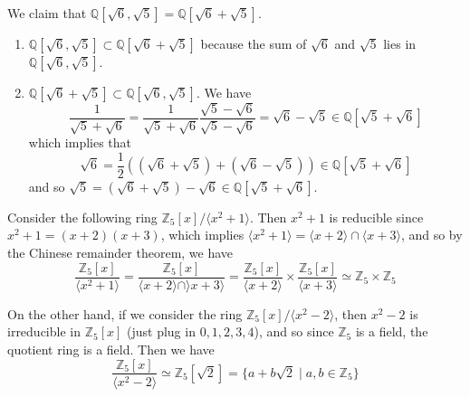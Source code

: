   \begin{example}
    We claim that $\mathbb{Q}[\sqrt{6}, \sqrt{5}] = \mathbb{Q}[\sqrt{6} + \sqrt{5}]$. 
    \begin{enumerate}
      \item $\mathbb{Q}[\sqrt{6}, \sqrt{5}] \subset \mathbb{Q}[\sqrt{6} + \sqrt{5}]$ because the sum of $\sqrt{6}$ and $\sqrt{5}$ lies in $\mathbb{Q}[\sqrt{6}, \sqrt{5}]$. 
      \item $\mathbb{Q}[\sqrt{6} + \sqrt{5}] \subset \mathbb{Q}[\sqrt{6}, \sqrt{5}]$. We have 
        \begin{equation}
          \frac{1}{\sqrt{5} + \sqrt{6}} = \frac{1}{\sqrt{5} + \sqrt{6}} \frac{\sqrt{5} - \sqrt{6}}{\sqrt{5} - \sqrt{6}} = \sqrt{6} - \sqrt{5} \in \mathbb{Q}[\sqrt{5} + \sqrt{6}] 
        \end{equation}
        which implies that 
        \begin{equation}
          \sqrt{6} = \frac{1}{2} ((\sqrt{6} + \sqrt{5}) + (\sqrt{6} - \sqrt{5})) \in \mathbb{Q}[\sqrt{5} + \sqrt{6}] 
        \end{equation}
        and so $\sqrt{5} = (\sqrt{6} + \sqrt{5}) - \sqrt{6} \in \mathbb{Q}[\sqrt{5} + \sqrt{6}]$. 
    \end{enumerate}
  \end{example}

  \begin{example}
    Consider the following ring $\mathbb{Z}_5 [x] / \langle x^2 + 1 \rangle$. Then $x^2 + 1$ is reducible since $x^2 + 1 = (x + 2) (x + 3)$, which implies $\langle x^2 + 1 \rangle = \langle x + 2 \rangle \cap \langle x + 3 \rangle$, and so by the Chinese remainder theorem, we have 
    \begin{equation}
      \frac{\mathbb{Z}_5 [x]}{\langle x^2 + 1 \rangle} = \frac{\mathbb{Z}_5 [x]}{\langle x + 2 \rangle \cap \rangle x + 3 \rangle} = \frac{\mathbb{Z}_5 [x]}{\langle x + 2 \rangle} \times \frac{\mathbb{Z}_5 [x]}{\langle x + 3 \rangle} \simeq \mathbb{Z}_5 \times \mathbb{Z}_5
    \end{equation}
  \end{example} 

  \begin{example}
    On the other hand, if we consider the ring $\mathbb{Z}_5 [x] / \langle x^2 - 2 \rangle$, then $x^2 - 2$ is irreducible in $\mathbb{Z}_5 [x]$ (just plug in $0, 1, 2, 3, 4$), and so since $\mathbb{Z}_5$ is a field, the quotient ring is a field. Then we have 
    \begin{equation}
      \frac{\mathbb{Z}_5 [x]}{\langle x^2 - 2 \rangle} \simeq \mathbb{Z}_5 [\sqrt{2}] = \{a + b \sqrt{2} \mid a, b \in \mathbb{Z}_5 \}
    \end{equation}
  \end{example} 

